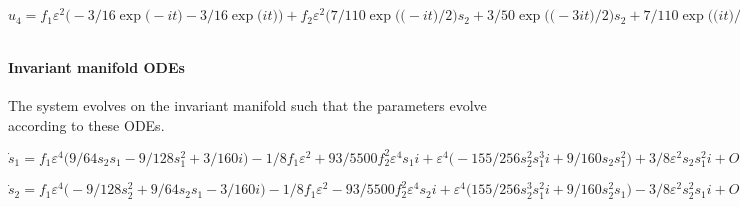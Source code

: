 \documentclass[11pt,a5paper]{article}
\def\eps{\varepsilon} \def\_{_}
\begin{document}
\(u_{4}=f\_1 \eps^{2} \big(-3/16 \exp \big(-i t\big)-3/16 \exp \big(i t
\big)\big)+f\_2 \eps^{2} \big(7/110 \exp \big(\big(-i t\big)/2\big) s_{2
}+3/50 \exp \big(\big(-3 i t\big)/2\big) s_{2}+7/110 \exp \big(\big(i t
\big)/2\big) s_{1}+3/50 \exp \big(\big(3 i t\big)/2\big) s_{1}\big)+\eps
^{2} \big(-9/16 \exp \big(-i t\big) s_{2}^{2} s_{1} i+1/32 \exp \big(-3 
i t\big) s_{2}^{3} i+9/16 \exp \big(i t\big) s_{2} s_{1}^{2} i-1/32 \exp
 \big(3 i t\big) s_{1}^{3} i\big)-\exp \big(-i t\big) s_{2} i+\exp \big(
i t\big) s_{1} i+O\big(\varepsilon ^{4}\big)
\)\par

\(
\)
\paragraph{Invariant manifold ODEs}
The system evolves on the invariant manifold such
that the parameters evolve according to these ODEs.
\(
\)\par

\(\dot s_{1}=f\_1 \eps^{4} \big(9/64 s_{2} s_{1}-9/128 s_{1}^{2}+3/160 i
\big)-1/8 f\_1 \eps^{2}+93/5500 f\_2^{2} \eps^{4} s_{1} i+\eps^{4} \big(
-155/256 s_{2}^{2} s_{1}^{3} i+9/160 s_{2} s_{1}^{2}\big)+3/8 \eps^{2} s
_{2} s_{1}^{2} i+O\big(\varepsilon ^{5}\big)
\)\par

\(\dot s_{2}=f\_1 \eps^{4} \big(-9/128 s_{2}^{2}+9/64 s_{2} s_{1}-3/160 i
\big)-1/8 f\_1 \eps^{2}-93/5500 f\_2^{2} \eps^{4} s_{2} i+\eps^{4} \big(
155/256 s_{2}^{3} s_{1}^{2} i+9/160 s_{2}^{2} s_{1}\big)-3/8 \eps^{2} s_
{2}^{2} s_{1} i+O\big(\varepsilon ^{5}\big)
\)\par

\(
\)\par
\end{document}
